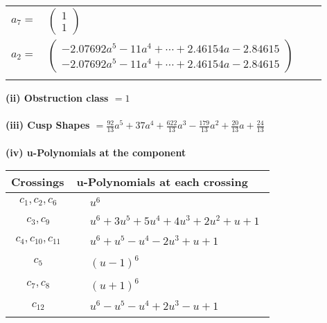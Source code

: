 \documentclass[1p]{elsarticle_modified}
\theoremstyle{definition}
\begin{document}
\begin{tabular}{m{7pt} m{180pt} m{7pt} m{180pt} }
\flushright $a_{7}=$&$\begin{pmatrix}1\\1\end{pmatrix}$ \\
\flushright $a_{2}=$&$\begin{pmatrix}-2.07692 a^{5}-11 a^{4}+\cdots+2.46154 a-2.84615\\-2.07692 a^{5}-11 a^{4}+\cdots+2.46154 a-2.84615\end{pmatrix}$\\&\end{tabular}
\flushleft \textbf{(ii) Obstruction class $= 1$}\\~\\
\flushleft \textbf{(iii) Cusp Shapes $= \frac{92}{13} a^5+37 a^4+\frac{622}{13} a^3-\frac{179}{13} a^2+\frac{20}{13} a+\frac{24}{13}$}\\~\\
\newpage\renewcommand{\arraystretch}{1}
\flushleft \textbf{(iv) u-Polynomials at the component}\newline \\
\begin{tabular}{m{50pt}|m{274pt}}
Crossings & \hspace{64pt}u-Polynomials at each crossing \\
\hline $$\begin{aligned}c_{1},c_{2},c_{6}\end{aligned}$$&$\begin{aligned}
&u^6
\end{aligned}$\\
\hline $$\begin{aligned}c_{3},c_{9}\end{aligned}$$&$\begin{aligned}
&u^6+3 u^5+5 u^4+4 u^3+2 u^2+u+1
\end{aligned}$\\
\hline $$\begin{aligned}c_{4},c_{10},c_{11}\end{aligned}$$&$\begin{aligned}
&u^6+u^5- u^4-2 u^3+u+1
\end{aligned}$\\
\hline $$\begin{aligned}c_{5}\end{aligned}$$&$\begin{aligned}
&(u-1)^6
\end{aligned}$\\
\hline $$\begin{aligned}c_{7},c_{8}\end{aligned}$$&$\begin{aligned}
&(u+1)^6
\end{aligned}$\\
\hline $$\begin{aligned}c_{12}\end{aligned}$$&$\begin{aligned}
&u^6- u^5- u^4+2 u^3- u+1
\end{aligned}$\\
\hline
\end{tabular}\\~\\
\end{document}
